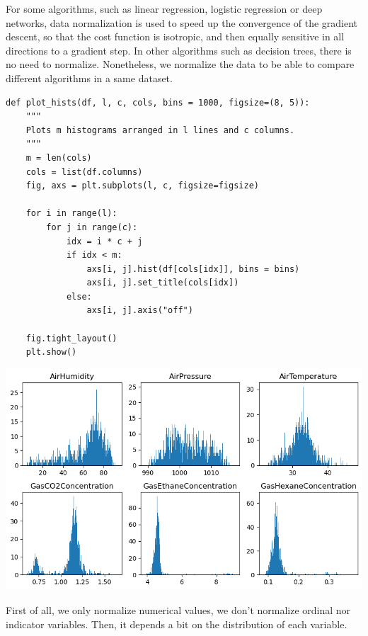 \documentclass[24pt]{article}
\begin{document}
For some algorithms, such as linear regression, logistic regression or deep networks, data normalization is used to speed up the convergence of the gradient descent, so that the cost function is isotropic, and then equally sensitive in all directions to a gradient step. In other algorithms such as decision trees, there is no need to normalize. Nonetheless, we normalize the data to be able to compare different algorithms in a same dataset.

\begin{lstlisting}
def plot_hists(df, l, c, cols, bins = 1000, figsize=(8, 5)):
    """
    Plots m histograms arranged in l lines and c columns.
    """
    m = len(cols)
    cols = list(df.columns)
    fig, axs = plt.subplots(l, c, figsize=figsize)

    for i in range(l):
        for j in range(c):
            idx = i * c + j
            if idx < m:
                axs[i, j].hist(df[cols[idx]], bins = bins)
                axs[i, j].set_title(cols[idx])          
            else:
                axs[i, j].axis("off")
    
    fig.tight_layout()
    plt.show()
\end{lstlisting}

\begin{center}
\includegraphics[scale = 0.6]{histograms_input.png}
\end{center}
First of all, we only normalize numerical values, we don't normalize ordinal nor indicator variables. Then, it depends a bit on the distribution of each variable.
\end{document}
